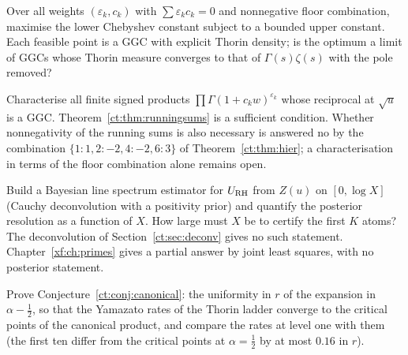 \begin{problem}\label{ct:op:sylvester}
Over all weights $(\varepsilon_k,c_k)$ with $\sum\varepsilon_kc_k=0$ and nonnegative floor combination, maximise the lower Chebyshev constant subject to a bounded upper constant. Each feasible point is a GGC with explicit Thorin density; is the optimum a limit of GGCs whose Thorin measure converges to that of $\Gamma(s)\zeta(s)$ with the pole removed?
\end{problem}
\begin{problem}\label{ct:op:signed}
Characterise all finite signed products $\prod\Gamma(1+c_kw)^{\varepsilon_k}$ whose reciprocal at $\sqrt u$ is a GGC. Theorem~\ref{ct:thm:runningsums} is a sufficient condition. Whether nonnegativity of the running sums is also necessary is answered no by the combination $\{1:1,2:-2,4:-2,6:3\}$ of Theorem~\ref{ct:thm:hier}; a characterisation in terms of the floor combination alone remains open.
\end{problem}
\begin{problem}
Build a Bayesian line spectrum estimator for $U_{\rm RH}$ from $Z(u)$ on $[0,\log X]$ (Cauchy deconvolution with a positivity prior) and quantify the posterior resolution as a function of $X$. How large must $X$ be to certify the first $K$ atoms? The deconvolution of Section~\ref{ct:sec:deconv} gives no such statement. Chapter~\ref{xf:ch:primes} gives a partial answer by joint least squares, with no posterior statement.
\end{problem}
\begin{problem}
Prove Conjecture~\ref{ct:conj:canonical}: the uniformity in $r$ of the expansion in $\alpha-\frac12$, so that the Yamazato rates of the Thorin ladder converge to the critical points of the canonical product, and compare the rates at level one with them (the first ten differ from the critical points at $\alpha=\frac12$ by at most $0.16$ in $r$).
\end{problem}
